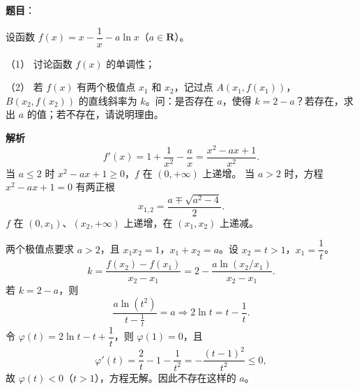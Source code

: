 \begin{answer}

\textbf{题目}：

设函数 $f(x)=x-\dfrac1x-a\ln x$（$a\in\mathbf R$）。

（1） 讨论函数 $f(x)$ 的单调性；

（2） 若 $f(x)$ 有两个极值点 $x_1$ 和 $x_2$，记过点 $A(x_1,f(x_1))$，$B(x_2,f(x_2))$ 的直线斜率为 $k$。问：是否存在 $a$，使得 $k=2-a$？若存在，求出 $a$ 的值；若不存在，请说明理由。

\textbf{解析}
\nopagebreak[4]
\[f'(x)=1+\frac1{x^2}-\frac ax=\frac{x^2-ax+1}{x^2}.\]
当 $a\leqslant2$ 时 $x^2-ax+1\geqslant0$，$f$ 在 $(0,+\infty)$ 上递增。
当 $a>2$ 时，方程 $x^2-ax+1=0$ 有两正根
\nopagebreak[4]
\[x_{1,2}=\frac{a\mp\sqrt{a^2-4}}2.\]
$f$ 在 $(0,x_1)$、$(x_2,+\infty)$ 上递增，在 $(x_1,x_2)$ 上递减。

两个极值点要求 $a>2$，且 $x_1x_2=1$，$x_1+x_2=a$。设 $x_2=t>1$，$x_1=\dfrac1t$。
\nopagebreak[4]
\[k=\frac{f(x_2)-f(x_1)}{x_2-x_1}
=2-\frac{a\ln(x_2/x_1)}{x_2-x_1}.\]
若 $k=2-a$，则
\nopagebreak[4]
\[\frac{a\ln(t^2)}{t-\frac1t}=a\Longrightarrow2\ln t=t-\frac1t.\]
令 $\varphi(t)=2\ln t-t+\dfrac1t$，则 $\varphi(1)=0$，且
\nopagebreak[4]
\[\varphi'(t)=\frac2t-1-\frac1{t^2}=-\frac{(t-1)^2}{t^2}\leqslant0,\]
故 $\varphi(t)<0$（$t>1$），方程无解。因此不存在这样的 $a$。



\end{answer}